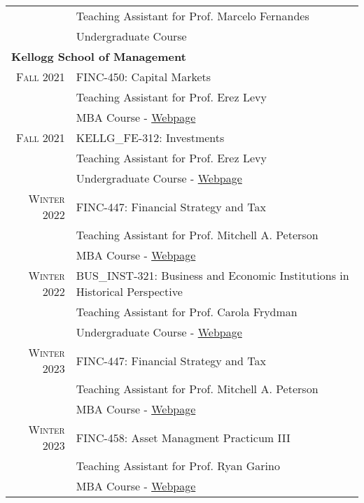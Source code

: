 \documentclass[a4paper,10pt]{article}
\begin{document}
\begin{tabular}{r|p{10.5cm}}
    & \footnotesize{Teaching Assistant for Prof. Marcelo Fernandes} \\
    & \footnotesize{Undergraduate Course} \\
    \multicolumn{2}{l}{\large\textbf{Kellogg School of Management}} \\
    \textsc{Fall} 2021 & FINC-450: Capital Markets \\
    & \footnotesize{Teaching Assistant for Prof. Erez Levy} \\
    & \footnotesize{MBA Course - \href{https://www6.kellogg.northwestern.edu/CourseCatalog/coursecatalog/coursedetail?coursecatalogid=204885}{Webpage}} \\
    \textsc{Fall} 2021 & KELLG\_FE-312: Investments \\
    & \footnotesize{Teaching Assistant for Prof. Erez Levy} \\
    & \footnotesize{Undergraduate Course - \href{https://www.kellogg.northwestern.edu/certificate/academics/financial-economics-certificate/courses.aspx}{Webpage}} \\
    \textsc{Winter} 2022 & FINC-447: Financial Strategy and Tax \\
    & \footnotesize{Teaching Assistant for Prof. Mitchell A. Peterson} \\
    & \footnotesize{MBA Course - \href{https://www6.kellogg.northwestern.edu/CourseCatalog/coursecatalog/coursedetail?coursecatalogid=204880}{Webpage}} \\
    \textsc{Winter} 2022 & BUS\_INST-321: Business and Economic Institutions in Historical Perspective \\
    & \footnotesize{Teaching Assistant for Prof. Carola Frydman} \\
    & \footnotesize{Undergraduate Course - \href{https://class-descriptions.northwestern.edu/4810/WCAS/BUS_INST/25643}{Webpage}} \\
    \textsc{Winter} 2023 & FINC-447: Financial Strategy and Tax \\
    & \footnotesize{Teaching Assistant for Prof. Mitchell A. Peterson} \\
    & \footnotesize{MBA Course - \href{https://www6.kellogg.northwestern.edu/CourseCatalog/coursecatalog/coursedetail?coursecatalogid=204880}{Webpage}} \\
    \textsc{Winter} 2023 & FINC-458: Asset Managment Practicum III \\
    & \footnotesize{Teaching Assistant for Prof. Ryan Garino} \\
    & \footnotesize{MBA Course - \href{https://www4.kellogg.northwestern.edu/CoursePlanning/CourseCatalog/CourseCatalogScreen?courseid=206757}{Webpage}} \\

\end{tabular}
\end{document}
